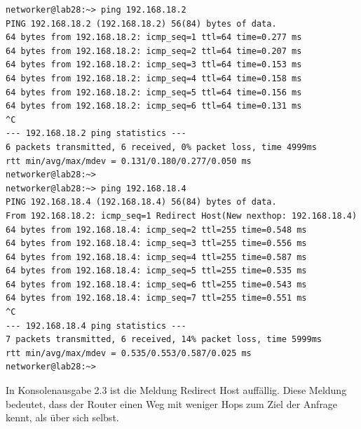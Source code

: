 \begin{lstlisting}[label=zurueckNetzPing,caption=Erfolgreicher Ping Test]
networker@lab28:~> ping 192.168.18.2
PING 192.168.18.2 (192.168.18.2) 56(84) bytes of data.
64 bytes from 192.168.18.2: icmp_seq=1 ttl=64 time=0.277 ms
64 bytes from 192.168.18.2: icmp_seq=2 ttl=64 time=0.207 ms
64 bytes from 192.168.18.2: icmp_seq=3 ttl=64 time=0.153 ms
64 bytes from 192.168.18.2: icmp_seq=4 ttl=64 time=0.158 ms
64 bytes from 192.168.18.2: icmp_seq=5 ttl=64 time=0.156 ms
64 bytes from 192.168.18.2: icmp_seq=6 ttl=64 time=0.131 ms
^C
--- 192.168.18.2 ping statistics ---
6 packets transmitted, 6 received, 0% packet loss, time 4999ms
rtt min/avg/max/mdev = 0.131/0.180/0.277/0.050 ms
networker@lab28:~>
networker@lab28:~> ping 192.168.18.4
PING 192.168.18.4 (192.168.18.4) 56(84) bytes of data.
From 192.168.18.2: icmp_seq=1 Redirect Host(New nexthop: 192.168.18.4)
64 bytes from 192.168.18.4: icmp_seq=2 ttl=255 time=0.548 ms
64 bytes from 192.168.18.4: icmp_seq=3 ttl=255 time=0.556 ms
64 bytes from 192.168.18.4: icmp_seq=4 ttl=255 time=0.587 ms
64 bytes from 192.168.18.4: icmp_seq=5 ttl=255 time=0.535 ms
64 bytes from 192.168.18.4: icmp_seq=6 ttl=255 time=0.543 ms
64 bytes from 192.168.18.4: icmp_seq=7 ttl=255 time=0.551 ms
^C
--- 192.168.18.4 ping statistics ---
7 packets transmitted, 6 received, 14% packet loss, time 5999ms
rtt min/avg/max/mdev = 0.535/0.553/0.587/0.025 ms
networker@lab28:~>
\end{lstlisting}
In Konsolenausgabe 2.3 ist die Meldung Redirect Host auffällig. Diese Meldung bedeutet, dass der Router einen Weg mit weniger Hops zum Ziel der Anfrage kennt, als über sich selbst. 
